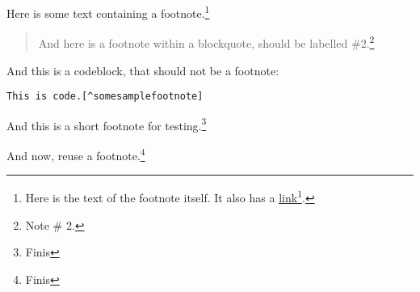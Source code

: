 
\def\mytitle{MultiMarkdown Footer Test}

Here is some text containing a footnote.\footnote{Here is the text of the footnote itself. It also has a \href{http://somelink.com}{link}\footnote{\href{http://somelink.com}{http:\slash \slash somelink.com}}.}

\begin{quote}

And here is a footnote within a blockquote, should be labelled \#2.\footnote{Note \# 2.}
\end{quote}

And this is a codeblock, that should not be a footnote:

\begin{verbatim}
This is code.[^somesamplefootnote]
\end{verbatim}


And this is a short footnote for testing.\footnote{Finis}

And now, reuse a footnote.\footnote{Finis}




